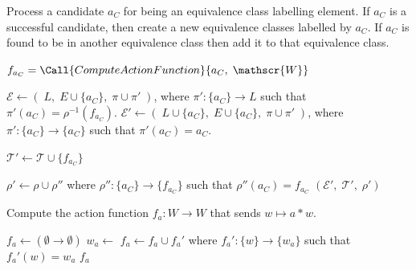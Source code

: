 \begin{algorithm}[H]
\caption{
Process a candidate $a_{C}$ for being an equivalence class labelling element.
If $a_{C}$ is a successful candidate, then create a new equivalence classes labelled by $a_{C}$.
If $a_{C}$ is found to be in another equivalence class then add it to that equivalence class.
}
\hrulefill
\begin{algorithmic}[1]
    \State $f_{a_{C}} = \Call{ComputeActionFunction}{a_{C}, \; \mathscr{W}}$

        \Statex {}
        \State $\mathcal{E} \gets (\; L, \; E \cup \{a_{C}\}, \; \pi \cup \pi' \;)$, where $\pi': \{a_{C}\} \to L$ such that $\pi'(a_{C}) = \rho^{-1}(f_{a_{C}})$.
    \Else
        \Statex {}
        \State $\mathcal{E}' \gets (\; L \cup \{a_{C}\}, \; E \cup \{a_{C}\}, \; \pi \cup \pi' \;)$, where $\pi': \{a_{C}\} \to \{a_{C}\}$ such that $\pi'(a_{C}) = a_{C}$.

        \Statex {}
        \State $\mathcal{T}' \gets \mathcal{T} \cup \{f_{a_{C}}\}$

        \Statex {}
        \State $\rho' \gets \rho \cup \rho''$ where $\rho'': \{a_{C}\} \to \{f_{a_{C}}\}$ such that $\rho''(a_{C}) = f_{a_{C}}$
    \EndIf
    \State \Return $(\mathcal{E}', \; \mathcal{T}', \; \rho')$
\EndProcedure
\end{algorithmic}
\end{algorithm}



\begin{algorithm}[H]
\caption{Compute the action function $f_{a}: W \to W$ that sends $w \mapsto a \ast w$.}
\hrulefill
\begin{algorithmic}[1]
    \State $f_{a} \gets (\emptyset \to \emptyset)$
        \State $w_{a} \gets$ 
        \State $f_{a} \gets f_{a} \cup f_{a}'$ where $f_{a}': \{w\} \to \{w_{a}\}$ such that $f_{a}'(w) = w_{a}$
    \EndFor
    \State \Return $f_{a}$
\EndProcedure
\end{algorithmic}
\end{algorithm}


